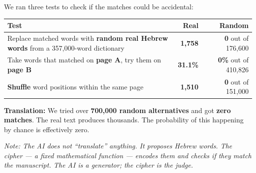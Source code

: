 \documentclass[11pt,a4paper]{article}
\begin{document}
\begin{tcolorbox}[title={\large Figure 2: Could this happen by chance?}]
We ran three tests to check if the matches could be accidental:

\medskip
\begin{center}
\renewcommand{\arraystretch}{1.5}
\begin{tabular}{p{6cm}rr}
\toprule
\textbf{Test} & \textbf{Real} & \textbf{Random} \\
\midrule
Replace matched words with \textbf{random real Hebrew words}
from a 357{,}000-word dictionary
& \textcolor{match}{\textbf{1{,}758}} & \textcolor{zero}{\textbf{0}} out of 176{,}600 \\[4pt]
Take words that matched on \textbf{page A},
try them on \textbf{page B}
& \textcolor{match}{\textbf{31.1\%}} & \textcolor{zero}{\textbf{0\%}} out of 410{,}826 \\[4pt]
\textbf{Shuffle} word positions within the same page
& \textcolor{match}{\textbf{1{,}510}} & \textcolor{zero}{\textbf{0}} out of 151{,}000 \\
\bottomrule
\end{tabular}
\end{center}

\medskip
\noindent
\textbf{Translation:} We tried over \textbf{700{,}000 random alternatives}
and got \textbf{zero matches}. The real text produces thousands.
The probability of this happening by chance is effectively zero.

\smallskip\noindent\small
\textit{Note: The AI does not ``translate'' anything. It proposes Hebrew
words. The cipher --- a fixed mathematical function --- encodes them and
checks if they match the manuscript. The AI is a generator; the cipher
is the judge.}
\end{tcolorbox}

\bigskip
\end{document}
